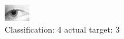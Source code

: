 \begin{figure}[h!]
\begin{center}
\includegraphics[width=0.60\columnwidth]{figures/ID1400_class_4_target_3.png}
\end{center}
\caption{ Classification: 4 actual target: 3}
\label{fig:ID1400_class_4_target_3}
\end{figure}
